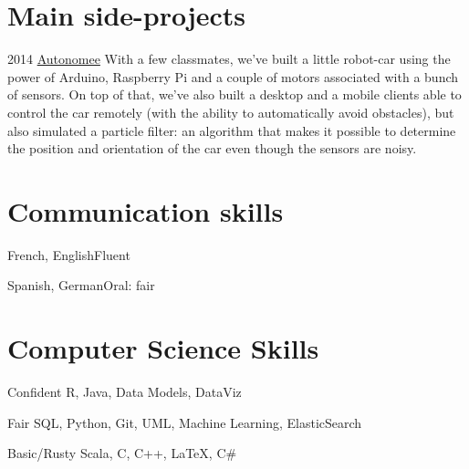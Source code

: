 \documentclass{tccv}
\begin{document}
\section{Main side-projects}

\begin{yearlist}

\item{2014}
     {\href{https://github.com/halflings/autonomee}{Autonomee}}
     {With a few classmates, we've built a little robot-car using the power of Arduino, Raspberry Pi and a couple of motors associated with a bunch of sensors. On top of that, we've also built a desktop and a mobile clients able to control the car remotely (with the ability to automatically avoid obstacles), but also simulated a particle filter: an algorithm that makes it possible to determine the position and orientation of the car even though the sensors are noisy.}

\end{yearlist}

\section{Communication skills}

\begin{factlist}
\item{French, English}{Fluent}
\item{Spanish, German}{Oral: fair}
\end{factlist}

\section{Computer Science Skills}

\begin{factlist}

\item{Confident}
     {R, Java, Data Models, DataViz}

\item{Fair}
     {SQL, Python, Git, UML, Machine Learning, ElasticSearch}

\item{Basic/Rusty}
     {Scala, C, C++, \LaTeX, C\#}

\end{factlist}
\end{document}
